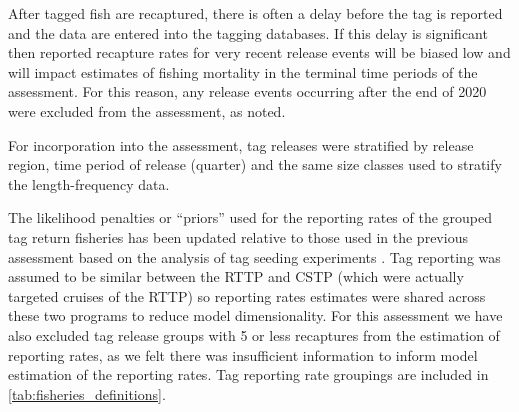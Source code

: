 After tagged fish are recaptured, there is often a delay before the tag is reported and the data are entered into the tagging databases. If this delay is significant then reported recapture rates for very recent release events will be biased low and will impact estimates of fishing mortality in the terminal time periods of the assessment. For this reason, any release events occurring after the end of 2020 were excluded from the assessment, as noted.

For incorporation into the assessment, tag releases were stratified by release region, time period of release (quarter) and the same size classes used to stratify the length-frequency data.

The likelihood penalties or \enquote{priors} used for the reporting rates of the grouped tag return fisheries has been updated relative to those used in the previous assessment based on the analysis of tag seeding experiments \citep{peatman_analysis_2023-2}. Tag reporting was assumed to be similar between the RTTP and CSTP (which were actually targeted cruises of the RTTP) so reporting rates estimates were shared across these two programs to reduce model dimensionality. For this assessment we have also excluded tag release groups with 5 or less recaptures from the estimation of reporting rates, as we felt there was insufficient information to inform model estimation of the reporting rates. Tag reporting rate groupings are included in \autoref{tab:fisheries_definitions}.
